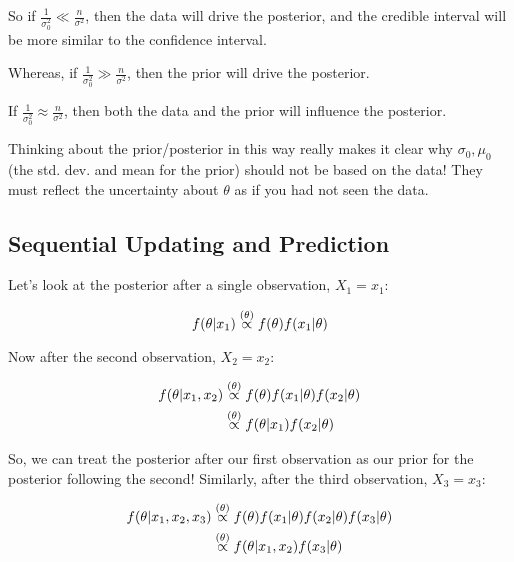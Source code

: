 \documentclass[a4paper]{article}
\begin{document}
                So if $\frac{1}{\sigma_0^2} \ll \frac{n}{\sigma^2}$, then the
                data will drive the posterior, and the credible interval will be
                more similar to the confidence interval.

                Whereas, if $\frac{1}{\sigma_0^2} \gg \frac{n}{\sigma^2}$, then
                the prior will drive the posterior.

                If $\frac{1}{\sigma_0^2} \approx \frac{n}{\sigma^2}$, then both
                the data and the prior will influence the posterior.

                \begin{warn}
                    Thinking about the prior/posterior in this way really makes
                    it clear why $\sigma_0, \mu_0$ (the std. dev. and mean for
                    the prior) should not be based on the data! They must
                    reflect the uncertainty about $\theta$ as if you had not
                    seen the data.
                \end{warn}

        \subsection{Sequential Updating and Prediction}
            Let's look at the posterior after a single observation, $X_1 = x_1$:

            \[
                f(\theta | x_1) \stackrel{({\theta})}{\propto} f(\theta)f(x_1 | \theta)
            \]

            Now after the second observation, $X_2 = x_2$:

            \begin{align*}
                f(\theta | x_1, x_2) &\stackrel{({\theta})}{\propto} f(\theta) f(x_1 | \theta)
                    f(x_2 | \theta) \\
                & \stackrel{({\theta})}{\propto} f(\theta | x_1) f(x_2 | \theta)
            \end{align*}

            So, we can treat the posterior after our first observation as our
            prior for the posterior following the second! Similarly, after the
            third observation, $X_3 = x_3$:

            \begin{align*}
                f(\theta | x_1, x_2, x_3) & \stackrel{({\theta})}{\propto} f(\theta) f(x_1 |
                    \theta) f(x_2 | \theta) f(x_3 | \theta) \\
                & \stackrel{({\theta})}{\propto} f(\theta | x_1, x_2) f(x_3 | \theta)
            \end{align*}
\end{document}
